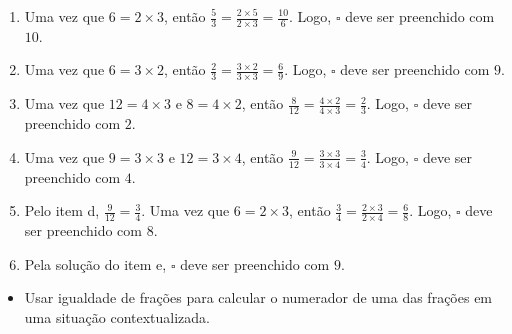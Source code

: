 \begin{multicols}{2}
\begin{orientacoes}


\end{orientacoes}

\begin{solucao}{}{}
\begin{enumerate} [\quad a)] %
    \item       Uma vez que       $6 = 2 \times 3$, então       $\frac{5}{3} =
\frac{2 \times 5}{2 \times 3} = \frac{10}{6}$. Logo,       $\square$       deve
ser preenchido com       $10$.
    \item       Uma vez que       $6 = 3 \times 2$, então       $\frac{2}{3} =
\frac{3 \times 2}{3 \times 3} = \frac{6}{9}$. Logo,       $\square$       deve
ser preenchido com       $9$.
    \item       Uma vez que       $12 = 4 \times 3$       e       $8 = 4 \times
2$, então       $\frac{8}{12} = \frac{4 \times 2}{4 \times 3} = \frac{2}{3}$.
Logo,       $\square$       deve ser preenchido com       $2$.
    \item       Uma vez que       $9 = 3 \times 3$       e       $12 = 3 \times
4$, então       $\frac{9}{12} = \frac{3 \times 3}{3 \times 4} = \frac{3}{4}$.
Logo,       $\square$       deve ser preenchido com       $4$.
    \item       Pelo item d,       $\frac{9}{12} = \frac{3}{4}$. Uma vez que
  $6 = 2 \times 3$, então       $\frac{3}{4} = \frac{2 \times 3}{2 \times 4} =
\frac{6}{8}$. Logo,       $\square$       deve ser preenchido com       $8$.
    \item       Pela solução do item e,       $\square$       deve ser
preenchido com       $9$.
\end{enumerate} %

\end{solucao}



\begin{objetivos}[label=chap4-ativ11]{}{}
\begin{itemize} %
    \item       Usar igualdade de frações para calcular o numerador de uma das
frações em uma situação contextualizada.
\end{itemize} %


\end{objetivos}
\end{multicols}
